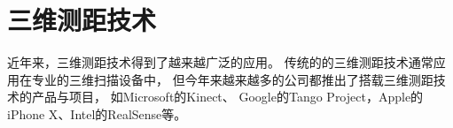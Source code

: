 \section{三维测距技术}
近年来，三维测距技术得到了越来越广泛的应用。
传统的的三维测距技术通常应用在专业的三维扫描设备中，
但今年来越来越多的公司都推出了搭载三维测距技术的产品与项目，
如Microsoft的Kinect\cite{microsoft_kinect}、
Google的Tango\cite{google_tango} Project，Apple的iPhone X\cite{apple_iphoneX}、Intel的RealSense\cite{intel_realsense}等。